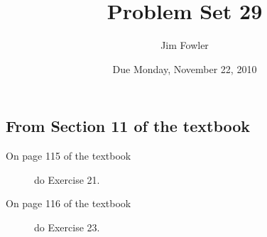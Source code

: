 \documentclass[12pt]{handout}
\author{Jim Fowler}
\title{Problem Set 29}
\date{Due Monday, November 22, 2010}
\begin{document}
\maketitle










\subsection*{From Section 11 of the textbook}



\begin{description}

\item[On page 115 of the textbook] do Exercise 21.

\item[On page 116 of the textbook] do Exercise 23.

\end{description}
\end{document}

